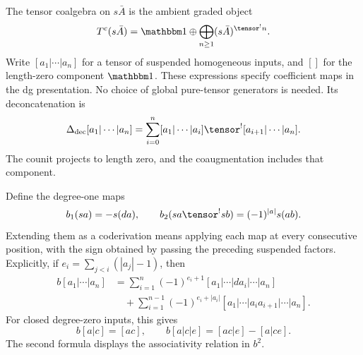 The tensor coalgebra on $s\bar A$ is the ambient graded object
\[
 T^c(s\bar A)=\mathbbm1\oplus
       \bigoplus_{n\geq1}(s\bar A)^{\tensor^!n}.
\]
Write $[a_1|\cdots|a_n]$ for a tensor of suspended homogeneous inputs, and $[]$ for the length-zero component $\mathbbm1$. These expressions specify coefficient maps in the dg presentation. No choice of global pure-tensor generators is needed. Its deconcatenation is
\begin{equation}\label{cbc:internal:deconcatenation}
 \Delta_{\mathrm{dec}}[a_1|\cdots|a_n]
 =\sum_{i=0}^n[a_1|\cdots|a_i]\tensor^!
                    [a_{i+1}|\cdots|a_n].
\end{equation}
The counit projects to length zero, and the coaugmentation includes that component.

Define the degree-one maps
\[
 b_1(sa)=-s(da),\qquad
 b_2(sa\tensor^!sb)=(-1)^{|a|}s(ab).
\]
Extending them as a coderivation means applying each map at every consecutive position, with the sign obtained by passing the preceding suspended factors. Explicitly, if $e_i=\sum_{j<i}(|a_j|-1)$, then
\begin{align*}
 b[a_1|\cdots|a_n]
 &=\sum_{i=1}^n(-1)^{e_i+1}
      [a_1|\cdots|da_i|\cdots|a_n]\\
 &\quad+\sum_{i=1}^{n-1}(-1)^{e_i+|a_i|}
      [a_1|\cdots|a_i a_{i+1}|\cdots|a_n].
\end{align*}
For closed degree-zero inputs, this gives
\[
 b[a|c]=[ac],\qquad
 b[a|c|e]=[ac|e]-[a|ce].
\]
The second formula displays the associativity relation in $b^2$.

